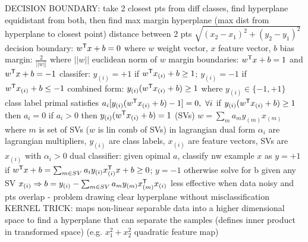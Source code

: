 \documentclass[10pt]{article}
\begin{document}
\NEW DECISION BOUNDARY: take 2 closest pts from diff classes, find hyperplane equidistant from both, then find max margin hyperplane (max dist from hyperplane to closest point)
\NEW distance between 2 pts $\sqrt{(x_2-x_1)^2 + (y_2-y_1)^2}$
\NEW decision boundary: $w^{\mathsf{T}} x + b = 0$ where $w$ weight vector, $x$ feature vector, $b$ bias
\NEW margin: $\frac{2}{||w||}$ where $||w||$ euclidean norm of $w$
\NEW margin boundaries: $w^{\mathsf{T}} x + b = 1$ and $w^{\mathsf{T}} x + b = -1$
\NEW classifer: $y_{(i)}= +1$ if $w^{\mathsf{T}} x_{(i)} + b \geq 1$; $y_{(i)}= -1$ if $w^{\mathsf{T}} x_{(i)} + b \leq -1$
\NEW combined form: $y_{(i)}(w^{\mathsf{T}} x_{(i)} + b) \geq 1$ where $y_{(i)} \in \{-1,+1\}$ class label
\NEW primal satisfies $a_i[y_{(i)}(w^\trans x_{(i)} + b) - 1] = 0,\ \forall i$
\NEW if $ y_{(i)}(w^{\mathsf{T}} x_{(i)} + b) \geq 1$ then $a_i = 0$
\NEW if $a_i > 0$ then $y_{(i)}(w^{\mathsf{T}} x_{(i)} + b) = 1$ (SVs)
\NEW $w = \sum_m a_m y_{(m)} x_{(m)}$ where $m$ is set of SVs ($w$ is lin comb of SVs)
\NEW in lagrangian dual form $\alpha_i$ are lagrangian multipliers, $y_{(i)}$ are class labels, $x_{(i)}$ are feature vectors, SVs are $x_{(i)}$ with $\alpha_i > 0$
\NEW dual classifier: given opimal $a$, classify nw example $x$ as $y= +1$ if $w^{\mathsf{T}} x + b = \sum_{m\in SV} a_i y_{(i)} x_{(i)}^{\mathsf{T}} x + b \geq 0$; $y= -1$ otherwise
\NEW solve for b given any SV $x_{(i)} \Rightarrow b = y_{(i)} - \sum_{m\in SV} a_m y_{(m)} x_{(m)}^{\mathsf{T}} x_{(i)}$
\NEW less effective when data noisy and pts overlap - problem drawing clear hyperplane without misclassification
\NEW KERNEL TRICK: maps non-linear separable data into a higher dimensional space to find a hyperplane that can separate the samples (defines inner product in transformed space) (e.g. $x_1^2 + x_2^2$ quadratic feature map)
\end{document}
